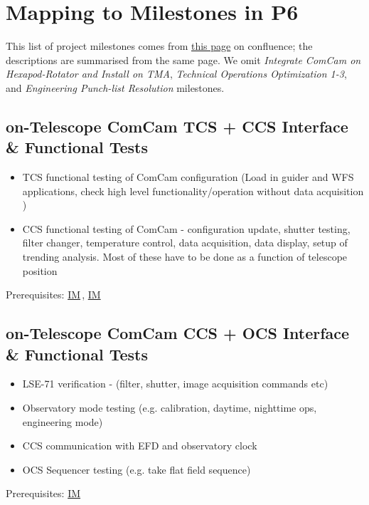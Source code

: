 \documentclass[SE,authoryear,toc]{lsstdoc}
\newcommand{\IM}[1]{\hyperref[IM:#1]{\color{blue}IM$_{\text{\csname nameIM#1\endcsname}}$}}
\begin{document}

\newcommand{\inputIM}[1]{\vfil\eject}
\inputIM{IMa}
\inputIM{IMb}
\inputIM{IMc}
\inputIM{IMd}
\inputIM{IMe}
\inputIM{IMf}
\inputIM{IMpg}
\inputIM{IMg}
\inputIM{IMh}
\inputIM{IMi}
\inputIM{IMj}
\inputIM{IMk}
\inputIM{IMcbp}  %
\inputIM{IMbacklog}

\appendix

\section{Mapping to Milestones in P6}
\label{sec:P6Milestones}

This list of project milestones comes from
\href{https://confluence.lsstcorp.org/pages/viewpage.action?pageId=62263966}{this page}
on confluence; the descriptions are summarised from the same page.  We omit
\textit{Integrate ComCam on Hexapod-Rotator and Install on TMA},
\textit{Technical Operations Optimization 1-3},
and
\textit{Engineering Punch-list Resolution} milestones.

\subsection{on-Telescope ComCam TCS + CCS Interface \& Functional Tests}

\begin{itemize}
\item
  TCS functional testing of ComCam configuration (Load in guider and WFS applications, check high level functionality/operation without data acquisition )
\item
  CCS functional testing of ComCam - configuration update, shutter testing, filter changer, temperature control, data acquisition, data display, setup of trending analysis. Most of these have to be done as a function of telescope position
\end{itemize}
Prerequisites: \IM{b}, \IM{g}

\subsection{on-Telescope ComCam CCS + OCS Interface \& Functional Tests}

\begin{itemize}
\item LSE-71 verification - (filter, shutter, image acquisition commands etc)
\item Observatory mode testing (e.g. calibration, daytime, nighttime ops, engineering mode)
\item CCS communication with EFD and observatory clock
\item OCS Sequencer testing (e.g. take flat field sequence)
\end{itemize}
Prerequisites: \IM{b}
\end{document}
